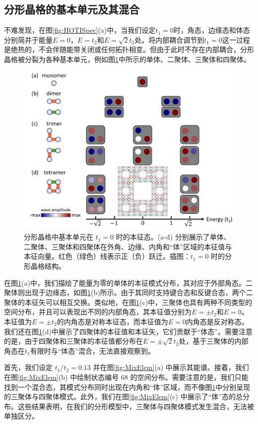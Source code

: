 \subsection{分形晶格的基本单元及其混合}
不难发现，在图\ref{fig:HOTISpec}(a)中，当我们设定$t_1=0$时，角态，边缘态和体态分别简并于能量$E=0$，$E=t_2$和$E=\sqrt{2}t_2$处。将内部耦合调节到$t_1=0$这一过程是绝热的，不会伴随能带关闭或任何拓扑相变。但由于此时不存在内部耦合，分形晶格被分裂为各种基本单元，例如图\ref{fig:Elemen}中所示的单体、二聚体、三聚体和四聚体。

\begin{figure}[htbp]
    \centering
    \includegraphics[width=0.75\linewidth]{figure/HOTITheo/Elemen.png}
    \caption{分形晶格中基本单元在 \( t_1=0 \) 时的本征态。(a-d) 分别展示了单体、二聚体、三聚体和四聚体在外角、边缘、内角和“体”区域的本征值与本征向量。红色（绿色）线表示正（负）跃迁。插图：\( t_1=0 \) 时的分形晶格结构。}
    \label{fig:Elemen}
\end{figure}

在图\ref{fig:Elemen}(a)中，我们描绘了能量为零的单体的本征模式分布，其对应于外部角态。二聚体则出现于边缘态，如图\ref{fig:Elemen}(b)所示。由于其同时支持键合态和反键合态，两个二聚体的本征矢可以相互交换。类似地，在图\ref{fig:Elemen}(c)中，三聚体也具有两种不同类型的空间分布，并且可以表现出不同的内部角态，其本征值分别为$E=±t_2$和$E=0$。 本征值为$E=±t_2$的内角态是对称本征态，而本征值为$E=0$内角态是反对称态。我们还在图\ref{fig:Elemen}(d)中展示了四聚体的本征值和本征矢，它们贡献于“体态”。需要注意的是，由于四聚体和三聚体的本征值都分布在$E=±\sqrt{2}t_2$处，基于三聚体的内部角态在$t_1$有限时与“体态”混合，无法直接观察到。

首先，我们设定 \( t_1/t_2=0.13 \) 并在图\ref{fig:MixElem}(a) 中展示其能谱。接着，我们在图\ref{fig:MixElem}(b) 中绘制状态编号 68 的空间分布。需要注意的是，我们只能找到一个混合态，其模式分布同时出现在内角和“体”区域，而不像图\ref{fig:Elemen}中分别呈现的三聚体与四聚体模式。此外，我们在图\ref{fig:MixElem}(c) 中展示了“体”态的总分布。这些结果表明，在我们的分形模型中，三聚体与四聚体模式发生混合，无法被单独区分。

